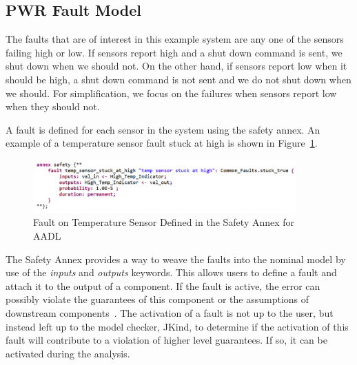 \subsection{PWR Fault Model}
The faults that are of interest in this example system are any one of the sensors failing high or low. If sensors report high and a shut down command is sent, we shut down when we should not. On the other hand, if sensors report low when it should be high, a shut down command is not sent and we do not shut down when we should. For simplification, we focus on the failures when sensors report low when they should not.

A fault is defined for each sensor in the system using the safety annex. An example of a temperature sensor fault stuck at high is shown in Figure~\ref{fig:tempSensorFault}.

\begin{figure}[h!]
	\vspace{-2em}
	\begin{center}
		\includegraphics[width=0.9\textwidth]{images/tempSensorFault.PNG}
	\end{center}
	\vspace{-2em}
	\caption{Fault on Temperature Sensor Defined in the Safety Annex for AADL}
	\label{fig:tempSensorFault}
	\vspace{-2em}
\end{figure}

The Safety Annex provides a way to weave the faults into the nominal model by use of the \emph{inputs} and \emph{outputs} keywords. This allows users to define a fault and attach it to the output of a component. If the fault is active, the error can possibly violate the guarantees of this component or the assumptions of downstream components~\cite{stewart2020safety}. The activation of a fault is not up to the user, but instead left up to the model checker, JKind, to determine if the activation of this fault will contribute to a violation of higher level guarantees. If so, it can be activated during the analysis.

